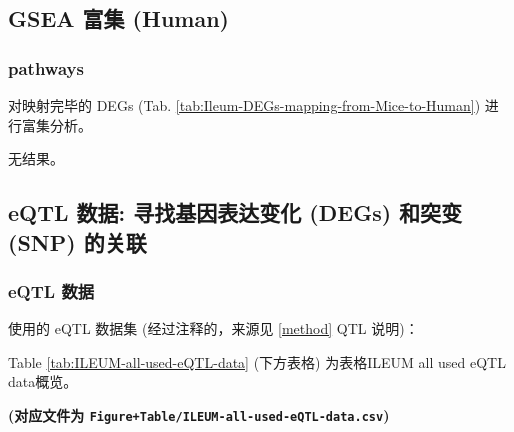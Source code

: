 \documentclass[
]{article}
\begin{document}
\hypertarget{gsea-ux5bccux96c6-human-1}{%
\subsection{GSEA 富集 (Human)}\label{gsea-ux5bccux96c6-human-1}}

\hypertarget{pathways-1}{%
\subsubsection{pathways}\label{pathways-1}}

对映射完毕的 DEGs (Tab. \ref{tab:Ileum-DEGs-mapping-from-Mice-to-Human}) 进行富集分析。

无结果。

\hypertarget{eqtl-ux6570ux636e-ux5bfbux627eux57faux56e0ux8868ux8fbeux53d8ux5316-degs-ux548cux7a81ux53d8-snp-ux7684ux5173ux8054-1}{%
\subsection{eQTL 数据: 寻找基因表达变化 (DEGs) 和突变 (SNP) 的关联}\label{eqtl-ux6570ux636e-ux5bfbux627eux57faux56e0ux8868ux8fbeux53d8ux5316-degs-ux548cux7a81ux53d8-snp-ux7684ux5173ux8054-1}}

\hypertarget{eqtl-ux6570ux636e-1}{%
\subsubsection{eQTL 数据}\label{eqtl-ux6570ux636e-1}}

使用的 eQTL 数据集 (经过注释的，来源见 \ref{method} QTL 说明)：

Table \ref{tab:ILEUM-all-used-eQTL-data} (下方表格) 为表格ILEUM all used eQTL data概览。

\textbf{(对应文件为 \texttt{Figure+Table/ILEUM-all-used-eQTL-data.csv})}
\end{document}
